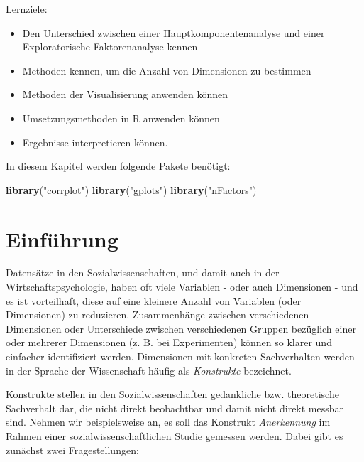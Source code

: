 \documentclass[12pt,ngerman,]{book}
\makeatletter
\newenvironment{Shaded}{\begin{snugshade}}{\end{snugshade}}
\newcommand{\KeywordTok}[1]{\textcolor[rgb]{0.13,0.29,0.53}{\textbf{{#1}}}}
\newcommand{\StringTok}[1]{\textcolor[rgb]{0.31,0.60,0.02}{{#1}}}
\newcommand{\NormalTok}[1]{{#1}}
\providecommand{\tightlist}{%
  \setlength{\itemsep}{0pt}\setlength{\parskip}{0pt}}
\newenvironment{kframe}{%
\medskip{}
\setlength{\fboxsep}{.8em}
 \def\at@end@of@kframe{}%
 \ifinner\ifhmode%
  \def\at@end@of@kframe{\end{minipage}}%
  \begin{minipage}{\columnwidth}%
 \fi\fi%
 \def\FrameCommand##1{\hskip\@totalleftmargin \hskip-\fboxsep
 \colorbox{shadecolor}{##1}\hskip-\fboxsep
     \hskip-\linewidth \hskip-\@totalleftmargin \hskip\columnwidth}%
 \MakeFramed {\advance\hsize-\width
   \@totalleftmargin\z@ \linewidth\hsize
   \@setminipage}}%
 {\par\unskip\endMakeFramed%
 \at@end@of@kframe}
\renewenvironment{Shaded}{\begin{kframe}}{\end{kframe}}
\let\BeginKnitrBlock\begin \let\EndKnitrBlock\end
\makeatother
\begin{document}
\BeginKnitrBlock{rmdcaution}
Lernziele:

\begin{itemize}
\tightlist
\item
  Den Unterschied zwischen einer Hauptkomponentenanalyse und einer
  Exploratorische Faktorenanalyse kennen
\item
  Methoden kennen, um die Anzahl von Dimensionen zu bestimmen
\item
  Methoden der Visualisierung anwenden können
\item
  Umsetzungsmethoden in R anwenden können
\item
  Ergebnisse interpretieren können.
\end{itemize}
\EndKnitrBlock{rmdcaution}

In diesem Kapitel werden folgende Pakete benötigt:

\begin{Shaded}
\begin{Highlighting}[]
\KeywordTok{library}\NormalTok{(}\StringTok{"corrplot"}\NormalTok{)}
\KeywordTok{library}\NormalTok{(}\StringTok{"gplots"}\NormalTok{)}
\KeywordTok{library}\NormalTok{(}\StringTok{"nFactors"}\NormalTok{)}
\end{Highlighting}
\end{Shaded}

\section{Einführung}\label{einfuhrung-1}

Datensätze in den Sozialwissenschaften, und damit auch in der
Wirtschaftspsychologie, haben oft viele Variablen - oder auch
Dimensionen - und es ist vorteilhaft, diese auf eine kleinere Anzahl von
Variablen (oder Dimensionen) zu reduzieren. Zusammenhänge zwischen
verschiedenen Dimensionen oder Unterschiede zwischen verschiedenen
Gruppen bezüglich einer oder mehrerer Dimensionen (z. B. bei
Experimenten) können so klarer und einfacher identifiziert werden.
Dimensionen mit konkreten Sachverhalten werden in der Sprache der
Wissenschaft häufig als \emph{Konstrukte} bezeichnet.

Konstrukte stellen in den Sozialwissenschaften gedankliche bzw.
theoretische Sachverhalt dar, die nicht direkt beobachtbar und damit
nicht direkt messbar sind. Nehmen wir beispielsweise an, es soll das
Konstrukt \emph{Anerkennung} im Rahmen einer sozialwissenschaftlichen
Studie gemessen werden. Dabei gibt es zunächst zwei Fragestellungen:
\end{document}
